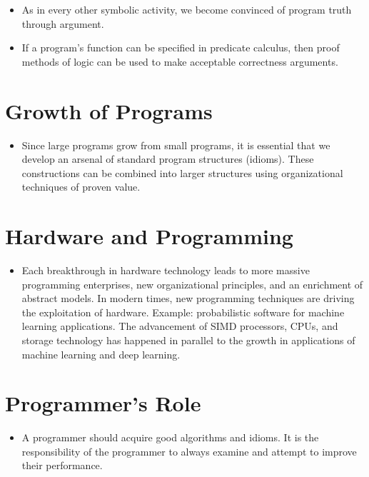\documentclass[12pt]{article}
\begin{document}
\begin{itemize}[leftmargin=*]
    \item As in every other symbolic activity, we become convinced of program truth through argument.
    \item If a program's function can be specified in predicate calculus, then proof methods of
    logic can be used to make acceptable correctness arguments.
\end{itemize}

\section*{Growth of Programs}

\begin{itemize}[leftmargin=*]
    \item Since large programs grow from small programs, it is essential that we develop an
    arsenal of standard program structures (idioms). These constructions can be combined into
    larger structures using organizational techniques of proven value.
\end{itemize}

\section*{Hardware and Programming}

\begin{itemize}[leftmargin=*]
    \item Each breakthrough in hardware technology leads to more massive programming enterprises,
    new organizational principles, and an enrichment of abstract models. In modern times, new
    programming techniques are driving the exploitation of hardware. Example: probabilistic
    software for machine learning applications. The advancement of SIMD processors, CPUs, and
    storage technology has happened in parallel to the growth in applications of machine learning
    and deep learning.
\end{itemize}

\section*{Programmer's Role}

\begin{itemize}[leftmargin=*]
    \item A programmer should acquire good algorithms and idioms. It is the responsibility of
    the programmer to always examine and attempt to improve their performance.
\end{itemize}
\end{document}
